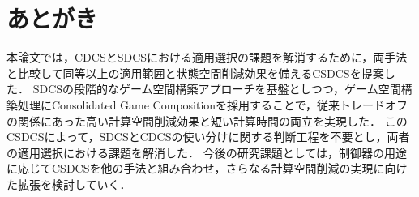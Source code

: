 \section{あとがき}
\label{section:conclusion}
本論文では，CDCSとSDCSにおける適用選択の課題を解消するために，両手法と比較して同等以上の適用範囲と状態空間削減効果を備えるCSDCSを提案した．
SDCSの段階的なゲーム空間構築アプローチを基盤としつつ，ゲーム空間構築処理にConsolidated Game Compositionを採用することで，従来トレードオフの関係にあった高い計算空間削減効果と短い計算時間の両立を実現した．
このCSDCSによって，SDCSとCDCSの使い分けに関する判断工程を不要とし，両者の適用選択における課題を解消した．
今後の研究課題としては，制御器の用途に応じてCSDCSを他の手法と組み合わせ，さらなる計算空間削減の実現に向けた拡張を検討していく．